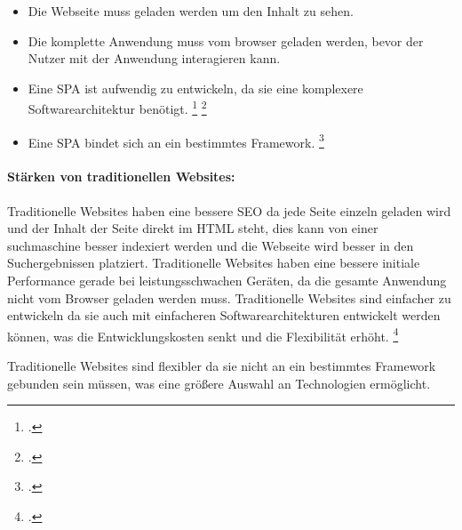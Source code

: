\begin{itemize}
    \item Die Webseite muss geladen werden um den Inhalt zu sehen.
    \item Die komplette Anwendung muss vom \gls{browser} geladen werden, bevor der Nutzer mit der Anwendung interagieren kann.
    \item Eine \ac{SPA} ist aufwendig zu entwickeln, da sie eine komplexere Softwarearchitektur benötigt. \footcite[Vgl. ][Seite 4]{Smith2022} \footcite[Vgl.][Seite 15]{Flanagan2011}
    \item Eine \ac{SPA} bindet sich an ein bestimmtes Framework. \footcite[Vgl. ][Seite 4]{Smith2022}
\end{itemize}






\paragraph*{Stärken von traditionellen Websites:}

Traditionelle Websites haben eine bessere \ac{SEO} da jede Seite einzeln geladen wird und der Inhalt der Seite direkt im \ac{HTML} steht,
dies kann von einer \gls{suchmaschine} besser indexiert werden und die Webseite wird besser in den Suchergebnissen platziert.
Traditionelle Websites haben eine bessere initiale Performance gerade bei leistungsschwachen Geräten, da die gesamte Anwendung nicht vom Browser geladen werden muss.
Traditionelle Websites sind einfacher zu entwickeln da sie auch mit einfacheren Softwarearchitekturen entwickelt werden können, was die Entwicklungskosten senkt und die Flexibilität erhöht.
\footcite[Vgl. ][Seite 4]{Smith2022}

Traditionelle Websites sind flexibler da sie nicht an ein bestimmtes Framework gebunden sein müssen, was eine größere Auswahl an Technologien ermöglicht.

